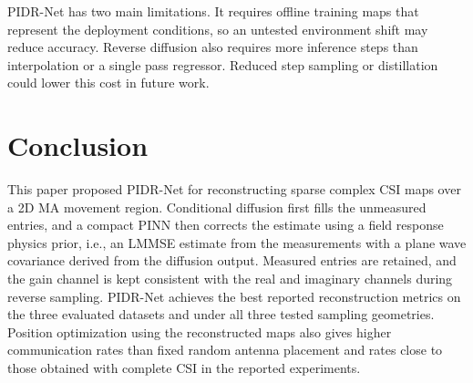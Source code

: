 \documentclass[lettersize,journal]{IEEEtran}
\begin{document}
PIDR-Net has two main limitations. It requires offline training maps that represent the deployment conditions, so an untested environment shift may reduce accuracy. Reverse diffusion also requires more inference steps than interpolation or a single pass regressor. Reduced step sampling or distillation could lower this cost in future work.

\section{Conclusion}
\label{sec:conclusion}

This paper proposed PIDR-Net for reconstructing sparse complex CSI maps over a 2D MA movement region. Conditional diffusion first fills the unmeasured entries, and a compact PINN then corrects the estimate using a field response physics prior, i.e., an LMMSE estimate from the measurements with a plane wave covariance derived from the diffusion output. Measured entries are retained, and the gain channel is kept consistent with the real and imaginary channels during reverse sampling. PIDR-Net achieves the best reported reconstruction metrics on the three evaluated datasets and under all three tested sampling geometries. Position optimization using the reconstructed maps also gives higher communication rates than fixed random antenna placement and rates close to those obtained with complete CSI in the reported experiments.



 
\end{document}
